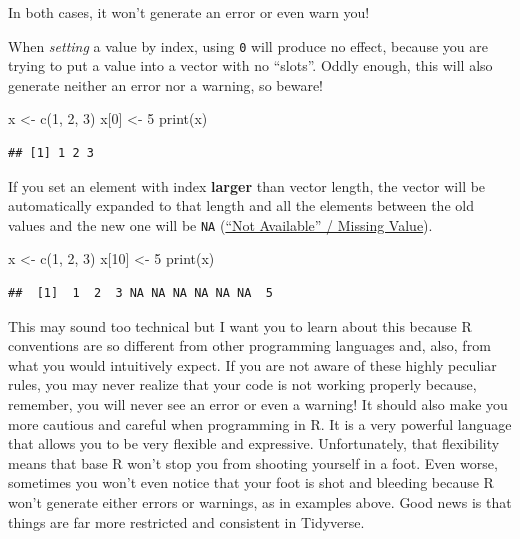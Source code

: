 \documentclass[
]{book}
\newenvironment{Shaded}{\begin{snugshade}}{\end{snugshade}}
\newcommand{\DecValTok}[1]{\textcolor[rgb]{0.00,0.00,0.81}{#1}}
\newcommand{\FunctionTok}[1]{\textcolor[rgb]{0.00,0.00,0.00}{#1}}
\newcommand{\NormalTok}[1]{#1}
\newcommand{\OtherTok}[1]{\textcolor[rgb]{0.56,0.35,0.01}{#1}}
\begin{document}
In both cases, it won't generate an error or even warn you!

When \emph{setting} a value by index, using \texttt{0} will produce no effect, because you are trying to put a value into a vector with no ``slots''. Oddly enough, this will also generate neither an error nor a warning, so beware!

\begin{Shaded}
\begin{Highlighting}[]
\NormalTok{x }\OtherTok{\textless{}{-}} \FunctionTok{c}\NormalTok{(}\DecValTok{1}\NormalTok{, }\DecValTok{2}\NormalTok{, }\DecValTok{3}\NormalTok{)}
\NormalTok{x[}\DecValTok{0}\NormalTok{] }\OtherTok{\textless{}{-}} \DecValTok{5}
\FunctionTok{print}\NormalTok{(x)}
\end{Highlighting}
\end{Shaded}

\begin{verbatim}
## [1] 1 2 3
\end{verbatim}

If you set an element with index \textbf{larger} than vector length, the vector will be automatically expanded to that length and all the elements between the old values and the new one will be \texttt{NA} (\href{https://stat.ethz.ch/R-manual/R-devel/library/base/html/NA.html}{``Not Available'' / Missing Value}).

\begin{Shaded}
\begin{Highlighting}[]
\NormalTok{x }\OtherTok{\textless{}{-}} \FunctionTok{c}\NormalTok{(}\DecValTok{1}\NormalTok{, }\DecValTok{2}\NormalTok{, }\DecValTok{3}\NormalTok{)}
\NormalTok{x[}\DecValTok{10}\NormalTok{] }\OtherTok{\textless{}{-}} \DecValTok{5}
\FunctionTok{print}\NormalTok{(x)}
\end{Highlighting}
\end{Shaded}

\begin{verbatim}
##  [1]  1  2  3 NA NA NA NA NA NA  5
\end{verbatim}

This may sound too technical but I want you to learn about this because R conventions are so different from other programming languages and, also, from what you would intuitively expect. If you are not aware of these highly peculiar rules, you may never realize that your code is not working properly because, remember, you will never see an error or even a warning! It should also make you more cautious and careful when programming in R. It is a very powerful language that allows you to be very flexible and expressive. Unfortunately, that flexibility means that base R won't stop you from shooting yourself in a foot. Even worse, sometimes you won't even notice that your foot is shot and bleeding because R won't generate either errors or warnings, as in examples above. Good news is that things are far more restricted and consistent in Tidyverse.
\end{document}
